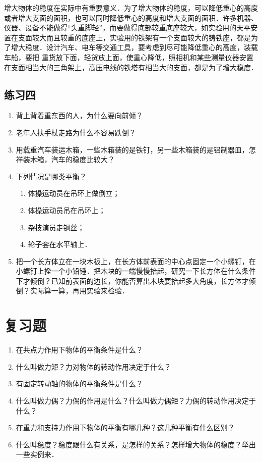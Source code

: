增大物体的稳度在实际中有重要意义．为了增大物体的稳度，可以降低重心的高度或者增大支面的面积，也可以同时降低重心的高度和增大支面的面积．许多机器、仪器、设备不能做得“头重脚轻”，而要做得底部较重底座较大，如实验用的天平安置在支面较大而且较重的底座上，实验用的铁架有一个支面较大的铸铁座，都是为了增大稳度．设计汽车、电车等交通工具，要考虑到尽可能降低重心的高度，装载车船，要把
重货放下面，轻货放上面，使重心降低，照相机和某些测量仪器安置在支面相当大的三角架上，高压电线的铁塔有相当大的支面，都是为了增大稳度．

\subsection*{练习四}
\begin{enumerate}
    \item 背上背着重东西的人，为什么要向前倾？
    \item 老年人扶手杖走路为什么不容易跌倒？
    \item 用载重汽车装运木箱，一些木箱装的是铁钉，另一些木箱装的是铝制器皿，怎祥装木箱，汽车的稳度比较大？
    \item 下列情况是哪类平衡？
    \begin{enumerate}
        \item 体操运动员在吊环上做倒立；
        \item 体操运动员吊在吊环上；
        \item 杂技演员走钢丝；
        \item 轮子套在水平轴上．
    \end{enumerate}
    \item 把一个长方体立在一块木板上，在长方体前表面的中心点固定一个小螺钉，在小螺钉上拴一个小铅锤．把木块的一端慢慢抬起，研究一下长方体在什么条件下才倾倒？已知前表面的边长，你能否算出木块要抬起多大角度，长方体才倾倒？实际算一算，再用实验来检验．
\end{enumerate}

\section*{复习题}

\begin{enumerate}
    \item 在共点力作用下物体的平衡条件是什么？
    \item 什么叫做力矩？力对物体的转动作用决定于什么？
    \item 有固定转动轴的物体的平衡条件是什么？
    \item 什么叫做力偶？力偶的作用是什么？什么叫做力偶矩？力偶的转动作用决定于什么？
    \item 在重力和支持力作用下物体的平衡有哪几种？这几种平衡有什么区别？
    \item 什么叫稳度？稳度跟什么有关系，是怎样的关系？怎样增大物体的稳度？举出一些实例来．
\end{enumerate}

